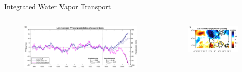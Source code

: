 \begin{frame}{Integrated Water Vapor Transport}

 \begin{columns}
   \begin{column}{0.5\textwidth}
    \begin{figure}[t]
      \centering
      \includegraphics[width=\columnwidth]{imglib/precipitation_iberian_future.png}
    \end{figure}
    
   \end{column}
   \begin{column}{0.5\textwidth}
    \begin{figure}[t]
      \centering
      \includegraphics[width=\columnwidth]{imglib/ar_rainfall_change.png}
    \end{figure}
    
   \end{column}
  
 \end{columns} 
\end{frame}
